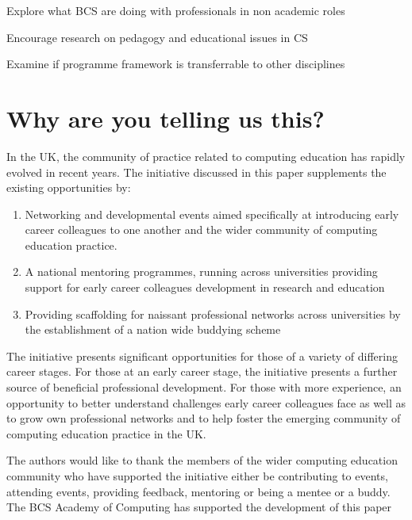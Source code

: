 \documentclass[sigconf]{acmart}
\begin{document}
Explore what BCS are doing with professionals in non academic roles

Encourage research on pedagogy and educational issues in CS

Examine if programme framework is transferrable to other disciplines
\section{Why are you telling us this?}
In the UK, the community of practice related to computing education has rapidly evolved in recent years. The initiative discussed in this paper supplements the existing opportunities by:
\begin{enumerate}
	\item Networking and developmental events aimed specifically at introducing early career colleagues to one another and the wider community of computing education practice.
	\item A national mentoring programmes, running across universities providing support for early career colleagues development in research and education
	\item Providing scaffolding for naissant professional networks across universities by the establishment of a nation wide buddying scheme 
\end{enumerate}

The initiative presents significant opportunities for those of a variety of differing career stages. For those at an early career stage, the initiative presents a further source of beneficial professional development. For those with more experience, an opportunity to better understand challenges early career colleagues face as well as to grow own professional networks and to help foster the emerging community of computing education practice in the UK. 

\begin{acks}
	
	The authors would like to thank the members of the wider computing education community who have supported the initiative either be contributing to events, attending events, providing feedback, mentoring or being a mentee or a buddy.
	The BCS Academy of Computing has supported the development of this paper
	
	
\end{acks}




\end{document}
